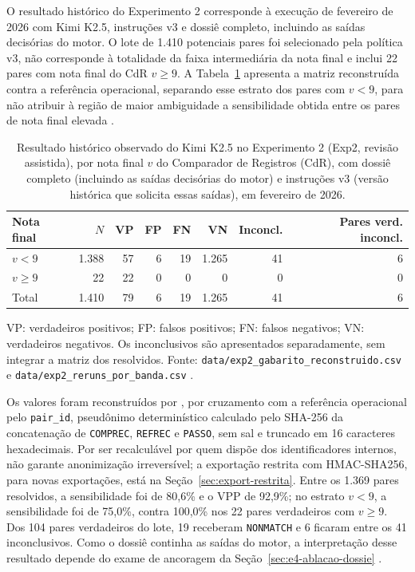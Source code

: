 O resultado histórico do Experimento 2 corresponde à execução de fevereiro de 2026 com Kimi K2.5, instruções v3 e dossiê completo, incluindo as saídas decisórias do motor. O lote de 1.410 potenciais pares foi selecionado pela política v3, não corresponde à totalidade da faixa intermediária da nota final e inclui 22 pares com nota final do CdR $v\geq9$. A Tabela~\ref{tab:cap8-revisao-desempenho} apresenta a matriz reconstruída contra a referência operacional, separando esse estrato dos pares com $v<9$, para não atribuir à região de maior ambiguidade a sensibilidade obtida entre os pares de nota final elevada \cite{Jardim2026phdrepo}.

\begin{table}[!ht]
\centering
\caption{Resultado histórico observado do Kimi K2.5 no Experimento 2 (Exp2, revisão assistida), por nota final $v$ do Comparador de Registros (CdR), com dossiê completo (incluindo as saídas decisórias do motor) e instruções v3 (versão histórica que solicita essas saídas), em fevereiro de 2026.}
\label{tab:cap8-revisao-desempenho}
\begin{tabular}{lrrrrrrr}
\hline
Nota final & $N$ & VP & FP & FN & VN & Inconcl. & Pares verd. inconcl. \\
\hline
$v<9$ & 1.388 & 57 & 6 & 19 & 1.265 & 41 & 6 \\
$v\geq9$ & 22 & 22 & 0 & 0 & 0 & 0 & 0 \\
Total & 1.410 & 79 & 6 & 19 & 1.265 & 41 & 6 \\
\hline
\end{tabular}%
\par\smallskip
\parbox{\linewidth}{\footnotesize VP: verdadeiros positivos; FP: falsos positivos; FN: falsos negativos; VN: verdadeiros negativos. Os inconclusivos são apresentados separadamente, sem integrar a matriz dos resolvidos. Fonte: \texttt{data/exp2\_gabarito\_reconstruido.csv} e \texttt{data/exp2\_reruns\_por\_banda.csv} \cite{Jardim2026phdrepo}.}
\end{table}

Os valores foram reconstruídos por , por cruzamento com a referência operacional pelo \texttt{pair\_id}, pseudônimo determinístico calculado pelo SHA-256 da concatenação de \texttt{COMPREC}, \texttt{REFREC} e \texttt{PASSO}, sem sal e truncado em 16 caracteres hexadecimais. Por ser recalculável por quem dispõe dos identificadores internos, não garante anonimização irreversível; a exportação restrita com HMAC-SHA256, para novas exportações, está na Seção~\ref{sec:export-restrita}. Entre os 1.369 pares resolvidos, a sensibilidade foi de 80,6\% e o VPP de 92,9\%; no estrato $v<9$, a sensibilidade foi de 75,0\%, contra 100,0\% nos 22 pares verdadeiros com $v\geq9$. Dos 104 pares verdadeiros do lote, 19 receberam \texttt{NONMATCH} e 6 ficaram entre os 41 inconclusivos. Como o dossiê continha as saídas do motor, a interpretação desse resultado depende do exame de ancoragem da Seção~\ref{sec:e4-ablacao-dossie} \cite{Jardim2026phdrepo}.

